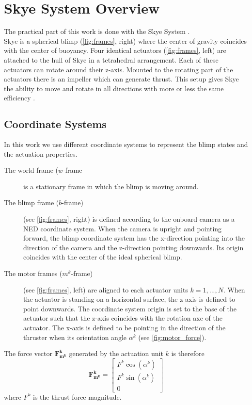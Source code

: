 \section{Skye System Overview}
The practical part of this work is done with the Skye System \citep{Skye2013}.\\
Skye is a spherical blimp (\cref{fig:frames}, right) where the center of gravity coincides with the center of buoyancy.
Four identical actuators (\cref{fig:frames}, left) are attached to the hull of Skye in a tetrahedral arrangement.
Each of these actuators can rotate around their z-axis.
Mounted to the rotating part of the actuators there is an impeller which can generate thrust.
This setup gives Skye the ability to move and rotate in all directions with more or less the same efficiency \citep[see][chap. 3]{Schaffner2012}.

\subsection{Coordinate Systems}
In this work we use different coordinate systems to represent the blimp states and the actuation properties.
\begin{description}
\item[The world frame ($w$-frame] is a stationary frame in which the blimp is moving around.
\item[The blimp frame ($b$-frame)] (see \cref{fig:frames}, right) is defined according to the onboard camera as a NED coordinate system. 
When the camera is upright and pointing forward, the blimp coordinate system has the x-direction pointing into the direction of the camera and the z-direction pointing downwards.
Its origin coincides with the center of the ideal spherical blimp.
\item[The motor frames ($m^k$-frame)] (see \cref{fig:frames}, left) are aligned to each actuator units $k=1,...,N$.
When the actuator is standing on a horizontal surface, the z-axis is defined to point downwards.
The coordinate system origin is set to the base of the actuator such that the z-axis coincides with the rotation axe of the actuator.
The x-axis is defined to be pointing in the direction of the thruster when its orientation angle $\alpha^k$ (see \cref{fig:motor_force}).
\end{description}

The force vector $\mathbf{F_{m^k}^k}$ generated by the actuation unit $k$ is therefore
\begin{equation}
\mathbf{F_{m^k}^k} = 
\left[\begin{array}{c}
F^k \cos(\alpha^k) \\
F^k \sin(\alpha^k) \\
0
\end{array}\right]
\end{equation}
where $F^k$ is the thrust force magnitude.

